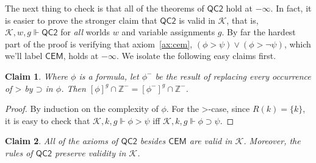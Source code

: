 \documentclass[12pt]{article}
\newtheorem{claim}{Claim}
\newcommand{\would}{\mathbin{>}}
\newcommand{\then}{\mathbin{\supset}}
\begin{document}
The next thing to check is that all of the theorems of $\mathsf{QC2}$ hold at $-\infty$. 
In fact, it is easier to prove the stronger claim that $\mathsf{QC2}$ is valid in $\mathcal{K}$, that is, $\mathcal{K},w,g \Vdash \mathsf{QC2}$ for \emph{all} worlds $w$ and variable assignments $g$. 
By far the hardest part of the proof is verifying that axiom~\ref{ax:cem}, $(\phi \would \psi) \vee (\phi \would \neg\psi)$, which we'll label $\mathsf{CEM}$, holds at $-\infty$. 
We isolate the following easy claims first.


\begin{claim}
\label{claim:reduceZ-}
    Where $\phi$ is a formula, let $\phi^-$ be the result of replacing every occurrence of $\would$ by $\then$ in $\phi$. 
    Then $[\phi]^g \cap \mathbb{Z}^- = [\phi^-]^g \cap \mathbb{Z}^-$. 
\end{claim}

\begin{proof}
    By induction on the complexity of $\phi$. 
    For the $\would$-case, since $R(k) = \{k\}$, it is easy to check that $\mathcal{K},k,g \Vdash \phi \would \psi$ iff $\mathcal{K},k,g \Vdash \phi \then \psi$. 
\end{proof}



\begin{claim}\label{without-cem}
    All of the axioms of $\mathsf{QC2}$ besides $\mathsf{CEM}$ are valid in $\mathcal{K}$.
    Moreover, the rules of $\mathsf{QC2}$ preserve validity in $\mathcal{K}$. 
\end{claim}
\end{document}
